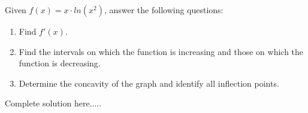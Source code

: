 \newpage
\begin{example}
Given $f(x)=x\cdot ln(x^2)$, answer the following questions:
\renewcommand{\labelenumi}{\textbf{(\alph{enumi})}}
\begin{enumerate}[leftmargin=*]
    \item Find $f'(x)$.
    \item Find the intervals on which the function is increasing and those on which the function is decreasing.
    \item Determine the concavity of the graph and identify all inflection points.
\end{enumerate}
    \begin{sol}
    \end{sol}
    \begin{solL}
    Complete solution here.....
    
    \end{solL}
    
\end{example}
\newpage
